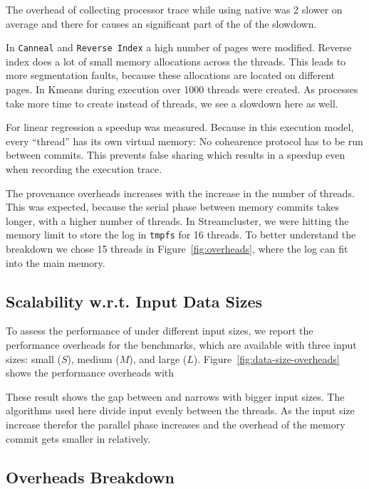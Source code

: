 The overhead of collecting processor trace while using native
\pthreads was 2 slower on average and there for causes an
significant part of the of the slowdown.

In {\tt Canneal} and {\tt Reverse Index} a high number of pages were modified.
Reverse index does a lot of small memory allocations across the threads. This
leads to more segmentation faults, because these allocations are located on
different pages. In Kmeans during execution over 1000 threads were created. As
processes take more time to create instead of threads, we see a slowdown here as
well.

For linear regression a speedup was measured. Because in this execution model,
every “thread” has its own virtual memory: No cohearence protocol has to be run
between commits. This prevents false sharing which results in a speedup even
when recording the execution trace.

The provenance overheads increases with the increase in the number of threads.
This was expected, because the serial phase between memory commits takes longer,
with a higher number of threads. In Streamcluster, we were hitting the memory
limit to store the log in {\tt tmpfs} for 16 threads. To better understand the
breakdown we chose 15 threads in Figure~\ref{fig:overheads}, where the log can
fit into the main memory. 


\subsection{Scalability w.r.t. Input Data Sizes}
\label{subsec:data-sizes-overheads}

To assess the performance of \projecttitle under different input sizes, we
report the performance overheads for the benchmarks, which are available with
three input sizes: small ($S$), medium ($M$), and large ($L$).
Figure~\ref{fig:data-size-overheads} shows the performance overheads with

These result shows the gap between \pthreads and \projecttitle narrows with
bigger input sizes. The algorithms used here divide input evenly between the
threads. As the input size increase therefor the parallel phase increases and
the overhead of the memory commit gets smaller in relatively.





\subsection{Overheads Breakdown}
\label{subsec:overheads-breakdown}

